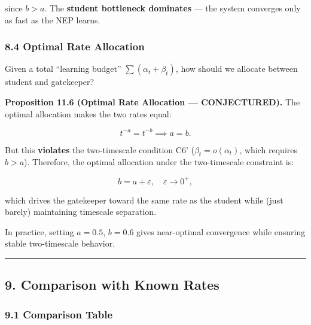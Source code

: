 \documentclass[
  12pt,
]{ctexart}
\begin{document}
since \(b > a\). The \textbf{student bottleneck dominates} --- the
system converges only as fast as the NEP learns.

\subsubsection{8.4 Optimal Rate
Allocation}\label{optimal-rate-allocation}

Given a total ``learning budget'' \(\sum (\alpha_t + \beta_t)\), how
should we allocate between student and gatekeeper?

\textbf{Proposition 11.6 (Optimal Rate Allocation --- CONJECTURED).} The
optimal allocation makes the two rates equal:

\[t^{-a} = t^{-b} \implies a = b.\]

But this \textbf{violates} the two-timescale condition C6'
(\(\beta_t = o(\alpha_t)\), which requires \(b > a\)). Therefore, the
optimal allocation under the two-timescale constraint is:

\[b = a + \varepsilon, \quad \varepsilon \to 0^+,\]

which drives the gatekeeper toward the same rate as the student while
(just barely) maintaining timescale separation.

In practice, setting \(a = 0.5\), \(b = 0.6\) gives near-optimal
convergence while ensuring stable two-timescale behavior.

\begin{center}\rule{0.5\linewidth}{0.5pt}\end{center}

\subsection{9. Comparison with Known
Rates}\label{comparison-with-known-rates}

\subsubsection{9.1 Comparison Table}\label{comparison-table}
\end{document}
